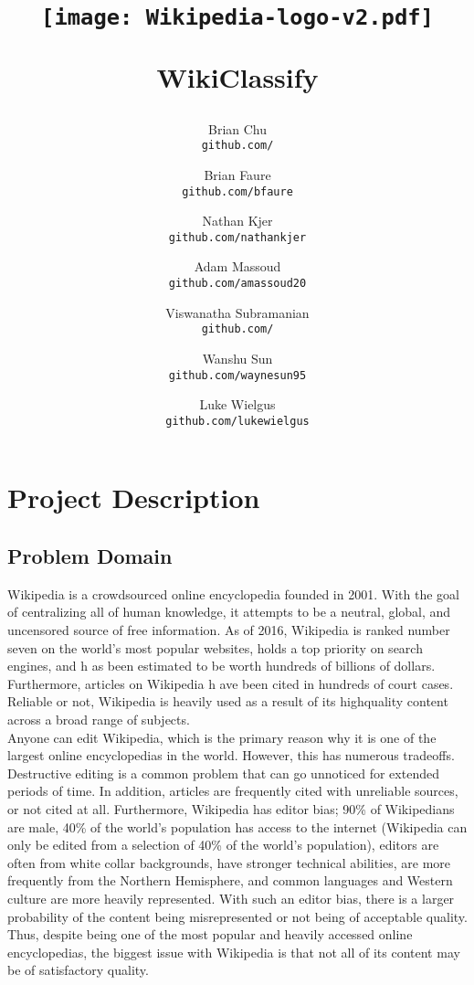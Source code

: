 \documentclass[10pt]{article}
\author{
  Brian Chu\\
  \texttt{github.com/}
  \and
  Brian Faure\\
  \texttt{github.com/bfaure}
  \and
  Nathan Kjer\\
  \texttt{github.com/nathankjer}
  \and
  Adam Massoud\\
  \texttt{github.com/amassoud20}
  \and
  Viswanatha Subramanian\\
  \texttt{github.com/}
  \and
  Wanshu Sun\\
  \texttt{github.com/waynesun95}
  \and
  Luke Wielgus\\
  \texttt{github.com/lukewielgus}
}
\date{}
\title{\centerline{\texttt{[image: Wikipedia-logo-v2.pdf]}}\vspace{3em}WikiClassify}
\begin{document}
\clearpage\maketitle
\thispagestyle{empty}

\newpage
\setcounter{page}{1}
\section*{Project Description}
\subsection*{Problem Domain}
\hspace*{28pt}Wikipedia is a crowdsourced online encyclopedia founded in 2001. With the goal of centralizing all of human knowledge, it attempts to be a neutral, global, and uncensored source of free information. As of 2016, Wikipedia is ranked number seven on the world’s most popular websites, holds a top priority on search engines, and h as been estimated to be worth hundreds of billions of dollars. Furthermore, articles on Wikipedia h ave been cited in hundreds of court cases. Reliable or not, Wikipedia is heavily used as a result of its high­quality content across a broad range of subjects.\\
\hspace*{28pt}Anyone can edit Wikipedia, which is the primary reason why it is one of the largest online encyclopedias in the world. However, this has numerous tradeoffs. Destructive editing is a common problem that can go unnoticed for extended periods of time. In addition, articles are frequently cited with unreliable sources, or not cited at all. Furthermore, Wikipedia has editor bias; 90\% of Wikipedians are male, 40\% of the world’s population has access to the internet (Wikipedia can only be edited from a selection of 40\% of the world’s population), editors are often from white collar backgrounds, have stronger technical abilities, are more frequently from the Northern Hemisphere, and common languages and Western culture are more heavily represented. With such an editor bias, there is a larger probability of the content being misrepresented or not being of acceptable quality.\\
\hspace*{28pt}Thus, despite being one of the most popular and heavily accessed online encyclopedias, the biggest issue with Wikipedia is that not all of its content may be of satisfactory quality.
\end{document}

